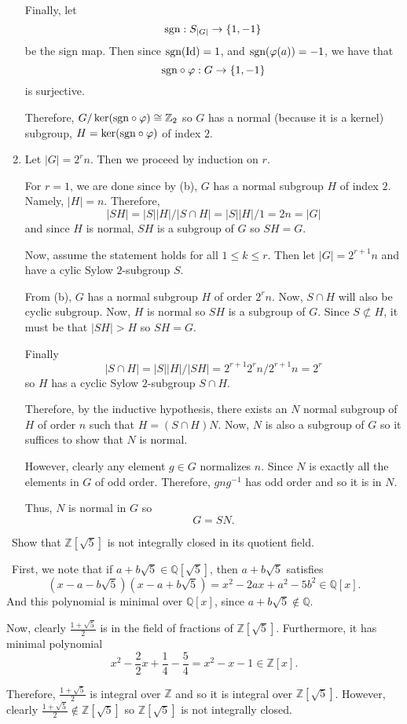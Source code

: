 \documentclass[12pt]{Qual}
\begin{document}
\begin{solution}
\begin{enumerate}[label=(\alph*)]
    Finally, let $$\text{sgn}:S_{|G|}\to \{1,-1\}$$ be the sign map. Then since $\text{sgn}(\text{Id})=1$, and $\text{sgn}(\varphi(a))=-1$, we have that $$\text{sgn}\circ\varphi:G\to \{1,-1\}$$ is surjective.

    Therefore, $G/\ker(\text{sgn}\circ\varphi)\cong\mathbb{Z}_2$ so $G$ has a normal (because it is a kernel) subgroup, $H=\ker(\text{sgn}\circ\varphi)$ of index $2$.

    \item Let $|G|=2^rn$. Then we proceed by induction on $r$.

    For $r=1$, we are done since by (b), $G$ has a normal subgroup $H$ of index $2$. Namely, $|H|=n$. Therefore, $$|SH|=|S||H|/|S\cap H|=|S||H|/1=2n=|G|$$ and since $H$ is normal, $SH$ is a subgroup of $G$ so $SH=G$.

    Now, assume the statement holds for all $1\le k\le r$. Then let $|G|=2^{r+1}n$ and have a cylic Sylow $2$-subgroup $S$.

    From (b), $G$ has a normal subgroup $H$ of order $2^rn$. Now, $S\cap H$ will also be cyclic subgroup. Now, $H$ is normal so $SH$ is a subgroup of $G$. Since $S\not\subset H$, it must be that $|SH|>H$ so $SH=G$.

    Finally $$|S\cap H|=|S||H|/|SH|=2^{r+1}2^rn/2^{r+1}n=2^r$$ so $H$ has a cyclic Sylow $2$-subgroup $S\cap H$.

    Therefore, by the inductive hypothesis, there exists an $N$ normal subgroup of $H$ of order $n$ such that $H=(S\cap H)N$. Now, $N$ is also a subgroup of $G$ so it suffices to show that $N$ is normal.

    However, clearly any element $g\in G$ normalizes $n$. Since $N$ is exactly all the elements in $G$ of odd order. Therefore, $gng^{-1}$ has odd order and so it is in $N$.

    Thus, $N$ is normal in $G$ so $$G=SN.$$
\end{enumerate}
\end{solution}
\newpage


\begin{problem} $\,$
Show that $\mathbb{Z}[\sqrt{5}]$ is not integrally closed in its quotient field.
\end{problem}


\begin{solution}$\,$
First, we note that if $a+b\sqrt{5}\in\mathbb{Q}[\sqrt{5}]$, then $a+b\sqrt{5}$ satisfies $$(x-a-b\sqrt{5})(x-a+b\sqrt{5})=x^2-2ax+a^2-5b^2\in\mathbb{Q}[x].$$ And this polynomial is minimal over $\mathbb{Q}[x]$, since $a+b\sqrt{5}\notin\mathbb{Q}$.

Now, clearly $\frac{1+\sqrt{5}}{2}$ is in the field of fractions of $\mathbb{Z}[\sqrt{5}]$. Furthermore, it has minimal polynomial $$x^2-\frac{2}{2}x+\frac{1}{4}-\frac{5}{4}=x^2-x-1\in\mathbb{Z}[x].$$

Therefore, $\frac{1+\sqrt{5}}{2}$ is integral over $\mathbb{Z}$ and so it is integral over $\mathbb{Z}[\sqrt{5}]$. However, clearly $\frac{1+\sqrt{5}}{2}\notin\mathbb{Z}[\sqrt{5}]$ so $\mathbb{Z}[\sqrt{5}]$ is not integrally closed.
\end{solution}
\newpage
\end{document}
